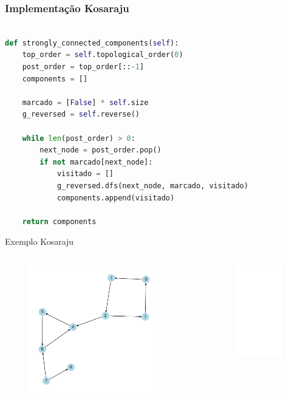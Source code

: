 \documentclass[aspectratio=169,usenames,dvipsnames]{beamer}
\begin{document}
\begin{frame}[fragile]  %
  \frametitle{Implementação Kosaraju}

      \begin{lstlisting}[language=Python, basicstyle=\ttfamily\small]

def strongly_connected_components(self):
    top_order = self.topological_order(0)
    post_order = top_order[::-1]
    components = []

    marcado = [False] * self.size
    g_reversed = self.reverse()

    while len(post_order) > 0:
        next_node = post_order.pop()
        if not marcado[next_node]:
            visitado = []
            g_reversed.dfs(next_node, marcado, visitado)
            components.append(visitado)

    return components
      \end{lstlisting}

\end{frame}

\begin{frame}{Exemplo Kosaraju}

  \begin{columns}
  \begin{figure}[ht]
  \centering
  \includegraphics[width=0.9\textwidth]{figs/strongly_components_3.pdf}
  \end{figure}
  \begin{figure}[ht]
  \centering
  \includegraphics<2>[width=0.9\textwidth]{figs/strongly_components_4.pdf}
  \end{figure}
  \end{columns}

\end{frame}
\end{document}
